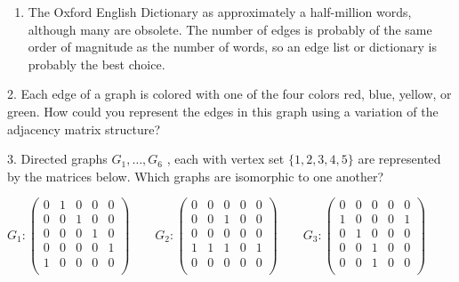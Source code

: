\documentclass[10pt,]{book}
\theoremstyle{plain}
\theoremstyle{definition}
\theoremstyle{definition}
\theoremstyle{definition}
\theoremstyle{definition}
\theoremstyle{definition}
\numberwithin{equation}{section}
\begin{document}
\begin{exercisegroup}
\begin{enumerate}[label=\alph*]
%
\item\hypertarget{li-31}{} The Oxford English Dictionary as approximately a half-million words, although many are obsolete.   The number of edges is probably of the same order of magnitude as the number of words, so an edge list or dictionary is probably the best choice.%
\end{enumerate}
%
\item[2.]\hypertarget{exercise-13}{} Each edge of a graph is colored with one of the four colors red, blue, yellow, or green. How could you represent the edges in this graph using
a variation of the adjacency matrix structure?%
\par\smallskip
\item[3.]\hypertarget{exercise-14}{}Directed graphs \(G_1, \dots, G_6\) , each with vertex set \(\{1,2,3,4,5\}\) are represented by the matrices below. Which graphs are isomorphic to one another?%
\par
 \(G_1: \left(
\begin{array}{ccccc}
 0 & 1 & 0 & 0 & 0 \\
 0 & 0 & 1 & 0 & 0 \\
 0 & 0 & 0 & 1 & 0 \\
 0 & 0 & 0 & 0 & 1 \\
 1 & 0 & 0 & 0 & 0 \\
\end{array}
\right)\)\(\quad \quad\)\(G_2: \left(
\begin{array}{ccccc}
 0 & 0 & 0 & 0 & 0 \\
 0 & 0 & 1 & 0 & 0 \\
 0 & 0 & 0 & 0 & 0 \\
 1 & 1 & 1 & 0 & 1 \\
 0 & 0 & 0 & 0 & 0 \\
\end{array}
\right)\)\(\quad \quad\)\(G_3: \left(
\begin{array}{ccccc}
 0 & 0 & 0 & 0 & 0 \\
 1 & 0 & 0 & 0 & 1 \\
 0 & 1 & 0 & 0 & 0 \\
 0 & 0 & 1 & 0 & 0 \\
 0 & 0 & 1 & 0 & 0 \\
\end{array}
\right)\)


\end{exercisegroup}
\end{document}
